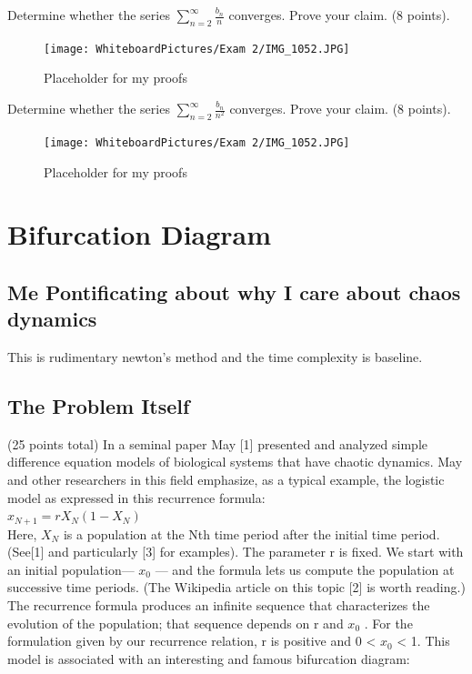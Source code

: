 \newpage
Determine whether the series $\sum_{n=2}^\infty \frac{b_n}{n}$ converges. Prove your claim. (8 points). \\ 
\begin{figure}[h]\begin{center}\texttt{[image: WhiteboardPictures/Exam 2/IMG\_1052.JPG]}
\caption{Placeholder for my proofs} \label{fig:Euler_pic}\end{center}\end{figure} 

\newpage 
Determine whether the series $\sum_{n=2}^\infty \frac{b_n}{n^2}$ converges. Prove your claim. (8 points). \\ 

\begin{figure}[h]\begin{center}\texttt{[image: WhiteboardPictures/Exam 2/IMG\_1052.JPG]}
\caption{Placeholder for my proofs} \label{fig:Euler_pic}\end{center}\end{figure} 

\newpage


\section{Bifurcation Diagram}


\subsection{Me Pontificating about why I care about chaos dynamics}
This is rudimentary newton's method and the time complexity is baseline. 


\subsection{The Problem Itself}
(25 points total) In a seminal paper May [1] presented and analyzed simple difference equation
models of biological systems that have chaotic dynamics. May and other researchers in this field
emphasize, as a typical example, the logistic model as expressed in this recurrence formula: \\ 
$x_{N+1}=rX_N(1-X_N)$ \\ 
Here, $X_N$ is a population at the Nth time period after the initial time period. (See[1] and particularly [3] for examples). The parameter r is fixed. We start with an initial population— $x_0$
 —
and the formula lets us compute the population at successive time periods. (The Wikipedia article
on this topic [2] is worth reading.) The recurrence formula produces an infinite sequence that
characterizes the evolution of the population; that sequence depends on r and $x_0$
.
For the formulation given by our recurrence relation, r is positive and 0 < $x_0$ < 1.
This model is associated with an interesting and famous bifurcation diagram: \\ 


